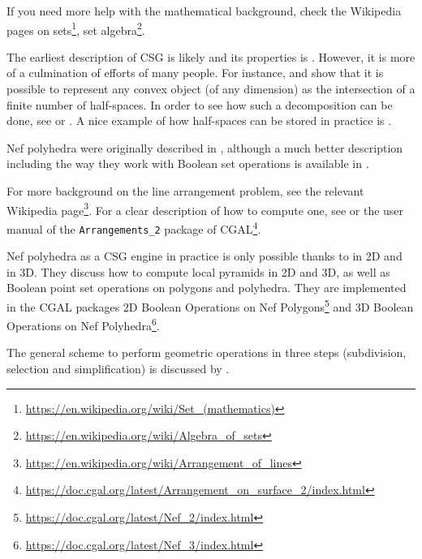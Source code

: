 If you need more help with the mathematical background, check the Wikipedia pages on sets\footnote{\url{https://en.wikipedia.org/wiki/Set_(mathematics)}}, set algebra\footnote{\url{https://en.wikipedia.org/wiki/Algebra_of_sets}}.

The earliest description of CSG is likely \citet[\S{}12.3]{Requicha77} and its properties is \citet{Requicha78}.
However, it is more of a culmination of efforts of many people.
For instance, \citet{Shamos76} and \citet{Preparata79} show that it is possible to represent any convex object (of any dimension) as the intersection of a finite number of half-spaces.
In order to see how such a decomposition can be done, see \citet{Chazelle79} or \citet{Bajaj90}.
A nice example of how half-spaces can be stored in practice is \citet{Naylor90}.

Nef polyhedra were originally described in \citet{Nef78}, although a much better description including the way they work with Boolean set operations is available in \citet{Bieri88}.

For more background on the line arrangement problem, see the relevant Wikipedia page\footnote{\url{https://en.wikipedia.org/wiki/Arrangement_of_lines}}.
For a clear description of how to compute one, see \citet[\S{}2]{deBerg08} or the user manual of the \texttt{Arrangements\_2} package of CGAL\footnote{\url{https://doc.cgal.org/latest/Arrangement_on_surface_2/index.html}}.

Nef polyhedra as a CSG engine in practice is only possible thanks to \citet{Seel01} in 2D and \citet{Hachenberger06} in 3D.
They discuss how to compute local pyramids in 2D and 3D, as well as Boolean point set operations on polygons and polyhedra.
They are implemented in the CGAL packages 2D Boolean Operations on Nef Polygons\footnote{\url{https://doc.cgal.org/latest/Nef_2/index.html}} and 3D Boolean Operations on Nef Polyhedra\footnote{\url{https://doc.cgal.org/latest/Nef_3/index.html}}.

The general scheme to perform geometric operations in three steps (subdivision, selection and simplification) is discussed by \citet{Rossignac89}.






